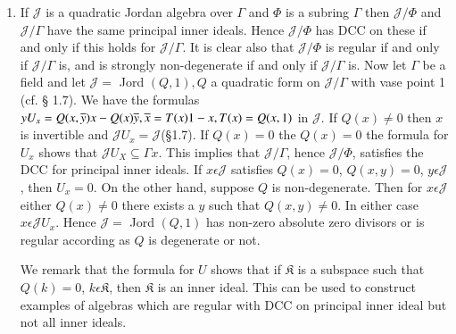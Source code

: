 \begin{examples*}
\begin{enumerate}
\item If $\mathscr{J}$ is a quadratic Jordan algebra over $\Gamma$ and
  $\Phi$ is a subring $\Gamma$ then $\mathscr{J}/\Phi$ and
  $\mathscr{J}/\Gamma$ have the same principal inner ideals. Hence
  $\mathscr{J}/\Phi$ has DCC on these if and only if this holds for
  $\mathscr{J}/\Gamma$. It is clear also that $\mathscr{J}/\Phi$ is
  regular if and only if $\mathscr{J}/\Gamma$ is, and is\pageoriginale
  strongly non-degenerate if and only if $\mathscr{J}/\Gamma$ is. Now
  let $\Gamma$ be a field and let $\mathscr{J}=$ Jord $(Q,1),Q$ a
  quadratic form on $\mathscr{J}/\Gamma$ with vase point 1 (cf. \S
  1.7). We have the formulas
  $yU_x=Q(x,\overline{y})x-Q(x)\overline{y},\overline{x}=T(x)1-x,T(x)=Q(x,1)$ in $\mathscr{J}$. If
  $Q(x)\neq 0$ then $x$ is invertible and
  $\mathscr{J}U_x=\mathscr{J}$(\S 1.7). If $Q(x)=0$ the $Q(x)=0$ the
  formula for $U_x$ shows that $\mathscr{J}U_X\subseteq\Gamma x$. This
  implies that $\mathscr{J}/\Gamma$, hence $\mathscr{J}/\Phi$,
  satisfies the DCC for principal inner ideals. If $x\epsilon
  \mathscr{J}$ satisfies $Q(x)=0$, $Q(x,y)=0$, $y\epsilon \mathscr{J}$,
  then $U_x=0$. On the other hand, suppose $Q$ is non-degenerate. Then
  for $x\epsilon \mathscr{J}$ either $Q(x)\neq 0$ there exists a $y$
  such that $Q(x,y)\neq 0$. In either case $x\epsilon
  \mathscr{J}U_x$. Hence $\mathscr{J}=$ Jord $(Q,1)$ has non-zero
  absolute zero divisors or is regular according as $Q$ is degenerate
  or not.

We remark that the formula for $U$ shows that if $\mathfrak{K}$ is a
subspace such that $Q(k)=0$, $k\epsilon \mathfrak{K}$, then
$\mathfrak{K}$ is an inner ideal. This can be used to construct
examples of algebras which are regular with DCC on principal inner
ideal but not all inner ideals.


\end{enumerate}
\end{examples*}
